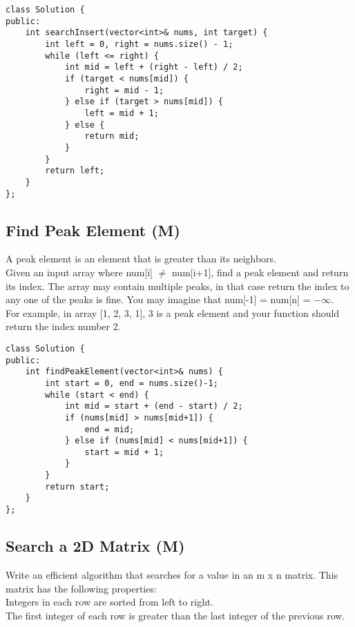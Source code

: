 \begin{lstlisting}
class Solution {
public:
    int searchInsert(vector<int>& nums, int target) {
        int left = 0, right = nums.size() - 1;
        while (left <= right) {
            int mid = left + (right - left) / 2;
            if (target < nums[mid]) {
                right = mid - 1;
            } else if (target > nums[mid]) {
                left = mid + 1;
            } else {
                return mid;
            }
        }
        return left;
    }
};
\end{lstlisting}


\subsection{Find Peak Element (M)}
A peak element is an element that is greater than its neighbors.\\

Given an input array where num[i] $\neq$ num[i+1], find a peak element and return its index.
The array may contain multiple peaks, in that case return the index to any one of the peaks is fine.
You may imagine that num[-1] = num[n] = $-\infty$.\\

For example, in array [1, 2, 3, 1], 3 is a peak element and your function should return the index number 2.\\

\begin{lstlisting}
class Solution {
public:
    int findPeakElement(vector<int>& nums) {
        int start = 0, end = nums.size()-1;
        while (start < end) {
            int mid = start + (end - start) / 2;
            if (nums[mid] > nums[mid+1]) {
                end = mid;
            } else if (nums[mid] < nums[mid+1]) {
                start = mid + 1;
            }
        }
        return start;
    }
};
\end{lstlisting}


\subsection{Search a 2D Matrix (M)}
Write an efficient algorithm that searches for a value in an m x n matrix. This matrix has the following properties:\\
    Integers in each row are sorted from left to right.\\
    The first integer of each row is greater than the last integer of the previous row.\\

